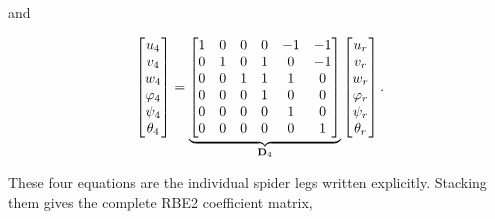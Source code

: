 and

\begin{equation}
    \begin{bmatrix}
        u_4\\v_4\\w_4\\\varphi_4\\\psi_4\\\theta_4
    \end{bmatrix}
    =
    \underbrace{\begin{bmatrix}
        1&0&0& 0&-1&-1\\
        0&1&0& 1& 0&-1\\
        0&0&1& 1& 1& 0\\
        0&0&0& 1& 0& 0\\
        0&0&0& 0& 1& 0\\
        0&0&0& 0& 0& 1
    \end{bmatrix}}_{\mathbf{D}_4}
    \begin{bmatrix}
        u_r\\v_r\\w_r\\\varphi_r\\\psi_r\\\theta_r
    \end{bmatrix}.
\end{equation}

These four equations are the individual spider legs written explicitly. Stacking
them gives the complete RBE2 coefficient matrix,

